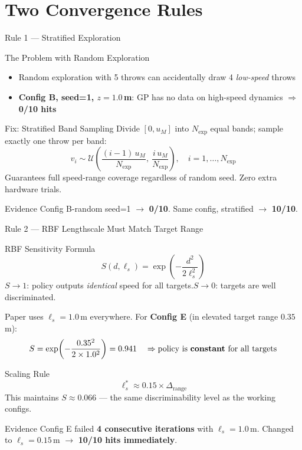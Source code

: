 \documentclass{if-beamer}
\begin{document}
\section{Two Convergence Rules}

\begin{frame}{Rule 1 --- Stratified Exploration}
    \begin{block}{The Problem with Random Exploration}
        \begin{itemize}
            \item Random exploration with 5 throws can accidentally draw 4 \textit{low-speed} throws
            \item \textbf{Config B, seed=1, $z=1.0$\,m}: GP has no data on high-speed dynamics $\Rightarrow$ \textbf{0/10 hits}
        \end{itemize}
    \end{block}
    \begin{block}{Fix: Stratified Band Sampling}
        Divide $[0, u_M]$ into $N_\text{exp}$ equal bands; sample exactly one throw per band:
        \[
            v_i \sim \mathcal{U}\!\left(\frac{(i-1)\,u_M}{N_\text{exp}},\ \frac{i\,u_M}{N_\text{exp}}\right),\quad i = 1,\ldots,N_\text{exp}
        \]
        Guarantees full speed-range coverage regardless of random seed. Zero extra hardware trials.
    \end{block}
    \begin{exampleblock}{Evidence}
        Config B-random seed=1 $\rightarrow$ \textbf{0/10}. \quad Same config, stratified $\rightarrow$ \textbf{10/10}.
    \end{exampleblock}
\end{frame}

\begin{frame}{Rule 2 --- RBF Lengthscale Must Match Target Range}
    \begin{block}{RBF Sensitivity Formula}
        \[
            S(d, \ell_s) = \exp\!\left(-\frac{d^2}{2\ell_s^2}\right)
        \]
        $S \to 1$: policy outputs \textit{identical} speed for all targets.\quad $S \to 0$: targets are well discriminated.
    \end{block}

    Paper uses $\ell_s = 1.0$\,m everywhere. For \textbf{Config E} (in elevated target range $0.35$\,m):
    \[
        S = \exp\!\left(-\frac{0.35^2}{2 \times 1.0^2}\right) = 0.941 \quad \Rightarrow \text{policy is \textbf{constant} for all targets}
    \]

    \begin{block}{Scaling Rule}
        \[
            \ell_s^* \approx 0.15 \times \Delta_\text{range}
        \]
        This maintains $S \approx 0.066$ --- the same discriminability level as the working configs.
    \end{block}
    \begin{exampleblock}{Evidence}
        Config E failed \textbf{4 consecutive iterations} with $\ell_s = 1.0$\,m.
        Changed to $\ell_s = 0.15$\,m $\rightarrow$ \textbf{10/10 hits immediately}.
    \end{exampleblock}
\end{frame}
\end{document}
